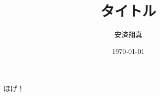 \documentclass[a4paper,11pt]{jsarticle}
\begin{document}
\title{タイトル}
\author{安済翔真}
\date{\today}
\maketitle


ほげ！

\end{document}
